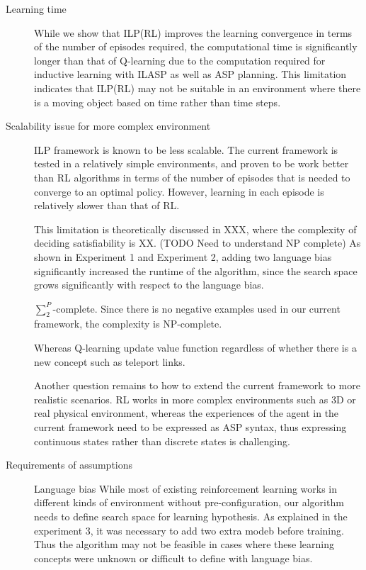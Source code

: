 \begin{description}
\item[Learning time]
While we show that ILP(RL) improves the learning convergence in terms of the number of episodes required, the computational time is significantly longer than that of Q-learning due to the computation required for inductive learning with ILASP as well as ASP planning.
This limitation indicates that ILP(RL) may not be suitable in an environment where there is a moving object based on time rather than time steps.

\item[Scalability issue for more complex environment]
ILP framework is known to be less scalable. The current framework is tested in a relatively simple environments, 
and proven to be work better than RL algorithms in terms of the number of episodes that is needed to converge to an optimal policy.
However, learning in each episode is relatively slower than that of RL. 

This limitation is theoretically discussed in XXX, where the complexity of deciding satisfiability is XX. (TODO Need to understand NP complete)
As shown in Experiment 1 and Experiment 2, adding two language bias significantly increased the runtime of the algorithm, since the search space grows significantly with respect to the language bias.

$\sum_{2}^{P}$-complete. Since there is no negative examples used in our current framework, the complexity is NP-complete.

Whereas Q-learning update value function regardless of whether there is a new concept such as teleport links.

Another question remains to how to extend the current framework to more realistic scenarios. RL works in more complex environments such as 3D or real physical environment, 
whereas the experiences of the agent in the current framework need to be expressed as ASP syntax, thus expressing continuous states rather than discrete states is challenging.

\item[Requirements of assumptions]

Language bias
While most of existing reinforcement learning works in different kinds of environment without pre-configuration, our algorithm
needs to define search space for learning hypothesis. As explained in the experiment 3, it was necessary to add two extra modeb before training.
Thus the algorithm may not be feasible in cases where these learning concepts were unknown or difficult to define with language bias. 


\end{description}
